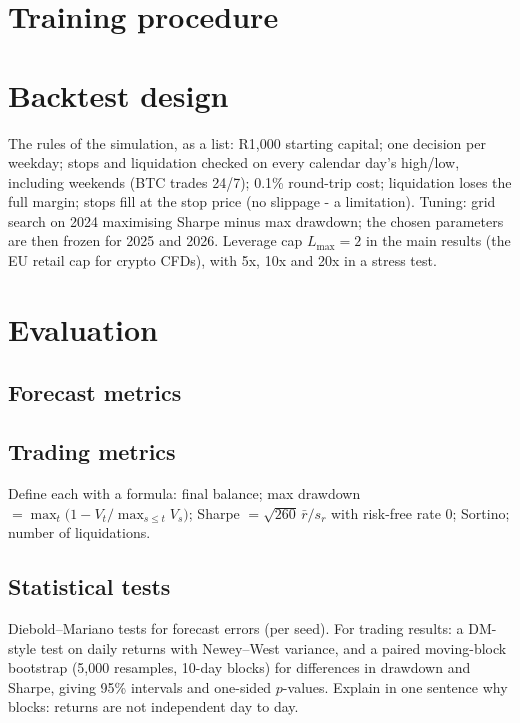 \section{Training procedure}

\section{Backtest design}\label{sec:backtest}
\begin{guide}
The rules of the simulation, as a list: R1{,}000 starting capital; one decision per weekday; stops and liquidation checked on every calendar day's high/low, including weekends (BTC trades 24/7); 0.1\% round-trip cost; liquidation loses the full margin; stops fill at the stop price (no slippage - a limitation). Tuning: grid search on 2024 maximising Sharpe minus max drawdown; the chosen parameters are then frozen for 2025 and 2026. Leverage cap $L_{\max} = 2$ in the main results (the EU retail cap for crypto CFDs), with 5x, 10x and 20x in a stress test.
\end{guide}
\tbc{}

\section{Evaluation}\label{sec:evaluation}
\subsection{Forecast metrics}

\subsection{Trading metrics}
\begin{guide}
Define each with a formula: final balance; max drawdown $= \max_t \big(1 - V_t / \max_{s\le t} V_s\big)$; Sharpe $= \sqrt{260}\,\bar r / s_r$ with risk-free rate 0; Sortino; number of liquidations.
\end{guide}
\tbc{}

\subsection{Statistical tests}
\begin{guide}
Diebold--Mariano tests for forecast errors (per seed). For trading results: a DM-style test on daily returns with Newey--West variance, and a paired moving-block bootstrap (5{,}000 resamples, 10-day blocks) for differences in drawdown and Sharpe, giving 95\% intervals and one-sided $p$-values. Explain in one sentence why blocks: returns are not independent day to day.
\end{guide}
\tbc{}
